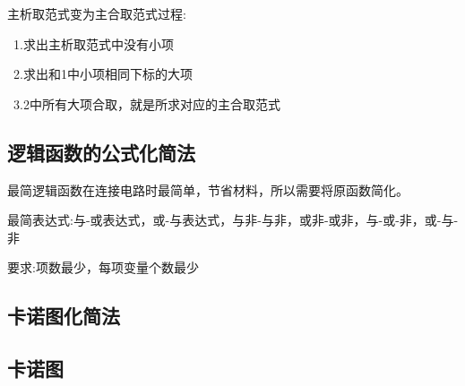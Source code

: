 \documentclass[11pt,twoside,a4paper]{ctexart}
\begin{document}
    主析取范式变为主合取范式过程:

    \ 1.求出主析取范式中没有小项

    \ 2.求出和1中小项相同下标的大项

    \ 3.2中所有大项合取，就是所求对应的主合取范式
    \subsection{逻辑函数的公式化简法}
    最简逻辑函数在连接电路时最简单，节省材料，所以需要将原函数简化。

    最简表达式:与-或表达式，或-与表达式，与非-与非，或非-或非，与-或-非，或-与-非

    要求:项数最少，每项变量个数最少
    \subsection{卡诺图化简法}
    \subsection{卡诺图}
    

    
\end{document}
